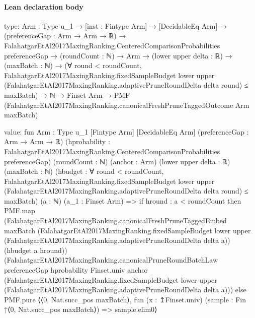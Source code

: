 \documentclass[10pt]{article}
\begin{document}
\paragraph{Lean declaration body}
\begin{ReviewVerbatim}
type:
{Arm : Type u_1} →
  [inst : Fintype Arm] →
    [DecidableEq Arm] →
      (preferenceGap : Arm → Arm → ℝ) →
        FalahatgarEtAl2017MaxingRanking.CenteredComparisonProbabilities preferenceGap →
          (roundCount : ℕ) →
            Arm →
              (lower upper delta : ℝ) →
                (maxBatch : ℕ) →
                  (∀ round < roundCount,
                      FalahatgarEtAl2017MaxingRanking.fixedSampleBudget lower upper
                          (FalahatgarEtAl2017MaxingRanking.adaptivePruneRoundDelta delta round) ≤
                        maxBatch) →
                    ℕ → Finset Arm → PMF (FalahatgarEtAl2017MaxingRanking.canonicalFreshPruneTaggedOutcome Arm maxBatch)

value:
fun {Arm : Type u_1} [Fintype Arm] [DecidableEq Arm] (preferenceGap : Arm → Arm → ℝ)
    (hprobability : FalahatgarEtAl2017MaxingRanking.CenteredComparisonProbabilities preferenceGap) (roundCount : ℕ)
    (anchor : Arm) (lower upper delta : ℝ) (maxBatch : ℕ)
    (hbudget :
      ∀ round < roundCount,
        FalahatgarEtAl2017MaxingRanking.fixedSampleBudget lower upper
            (FalahatgarEtAl2017MaxingRanking.adaptivePruneRoundDelta delta round) ≤
          maxBatch)
    (a : ℕ) (a_1 : Finset Arm) =>
  if hround : a < roundCount then
    PMF.map
      (FalahatgarEtAl2017MaxingRanking.canonicalFreshPruneTaggedEmbed maxBatch
        (FalahatgarEtAl2017MaxingRanking.fixedSampleBudget lower upper
          (FalahatgarEtAl2017MaxingRanking.adaptivePruneRoundDelta delta a))
        (hbudget a hround))
      (FalahatgarEtAl2017MaxingRanking.canonicalPruneRoundBatchLaw preferenceGap hprobability Finset.univ anchor
        (FalahatgarEtAl2017MaxingRanking.fixedSampleBudget lower upper
          (FalahatgarEtAl2017MaxingRanking.adaptivePruneRoundDelta delta a)))
  else
    PMF.pure
      ⟨⟨0, Nat.succ_pos maxBatch⟩, fun (x : ↥Finset.univ) (sample : Fin ↑⟨0, Nat.succ_pos maxBatch⟩) => sample.elim0⟩
\end{ReviewVerbatim}
\end{document}
